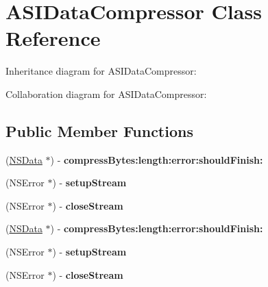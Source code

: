 \hypertarget{interface_a_s_i_data_compressor}{
\section{\-A\-S\-I\-Data\-Compressor \-Class \-Reference}
\label{interface_a_s_i_data_compressor}
}


\-Inheritance diagram for \-A\-S\-I\-Data\-Compressor\-:


\-Collaboration diagram for \-A\-S\-I\-Data\-Compressor\-:
\subsection*{\-Public \-Member \-Functions}
\begin{DoxyCompactItemize}
\item 
\hypertarget{interface_a_s_i_data_compressor_a2190fb1c48f0fcc0a68fecbf04552f8c}{
(\hyperlink{class_n_s_data}{\-N\-S\-Data} $\ast$) -\/ {\bfseries compress\-Bytes\-:length\-:error\-:should\-Finish\-:}}
\label{interface_a_s_i_data_compressor_a2190fb1c48f0fcc0a68fecbf04552f8c}

\item 
\hypertarget{interface_a_s_i_data_compressor_af1a40ec1ac24132c7349fc0658639dfa}{
(\-N\-S\-Error $\ast$) -\/ {\bfseries setup\-Stream}}
\label{interface_a_s_i_data_compressor_af1a40ec1ac24132c7349fc0658639dfa}

\item 
\hypertarget{interface_a_s_i_data_compressor_a51d7144538df7dd6a6a19f91f9bfe298}{
(\-N\-S\-Error $\ast$) -\/ {\bfseries close\-Stream}}
\label{interface_a_s_i_data_compressor_a51d7144538df7dd6a6a19f91f9bfe298}

\item 
\hypertarget{interface_a_s_i_data_compressor_a2190fb1c48f0fcc0a68fecbf04552f8c}{
(\hyperlink{class_n_s_data}{\-N\-S\-Data} $\ast$) -\/ {\bfseries compress\-Bytes\-:length\-:error\-:should\-Finish\-:}}
\label{interface_a_s_i_data_compressor_a2190fb1c48f0fcc0a68fecbf04552f8c}

\item 
\hypertarget{interface_a_s_i_data_compressor_af1a40ec1ac24132c7349fc0658639dfa}{
(\-N\-S\-Error $\ast$) -\/ {\bfseries setup\-Stream}}
\label{interface_a_s_i_data_compressor_af1a40ec1ac24132c7349fc0658639dfa}

\item 
\hypertarget{interface_a_s_i_data_compressor_a51d7144538df7dd6a6a19f91f9bfe298}{
(\-N\-S\-Error $\ast$) -\/ {\bfseries close\-Stream}}
\label{interface_a_s_i_data_compressor_a51d7144538df7dd6a6a19f91f9bfe298}


\end{DoxyCompactItemize}
